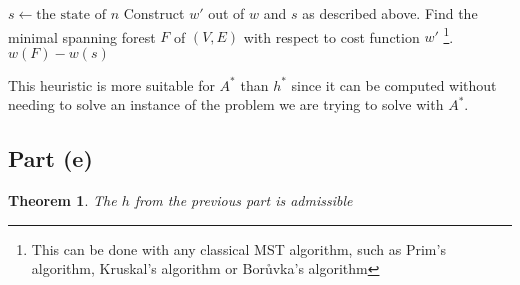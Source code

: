 \documentclass[a4paper,12pt]{scrartcl}
\newtheorem{theorem}{Theorem}
\begin{document}
\begin{algorithmic}[1]
        \State {}
    \EndIf
    \State $s \gets \text{the state of } n$
    \State Construct $w'$ out of $w$ and $s$ as described above.
    \State Find the minimal spanning forest $F$ of $(V, E)$ with respect to cost function $w'$ \footnote{This can be done with any classical MST algorithm, such as Prim's algorithm, Kruskal's algorithm or Borůvka's algorithm}.
    \State \Return $w(F) - w(s)$ 
    \EndFunction
\end{algorithmic}

This heuristic is more suitable for $A^*$ than $h^*$ since it can be computed without needing to solve an instance of the problem we are trying to solve with $A^*$.

\subsection*{Part (e)}
\begin{theorem}
    The $h$ from the previous part is admissible
\end{theorem}
\end{document}
